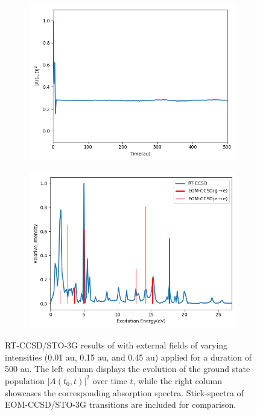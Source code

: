 \begin{figure}
\begin{subfigure}{0.47\textwidth}
         \includegraphics[width=\textwidth]{ch4/Figs/12-5.png}
     \end{subfigure}
     \hfill
     \begin{subfigure}{0.47\textwidth}
         \centering
         \includegraphics[width=\textwidth]{ch4/Figs/12-6.png}
     \end{subfigure}
     \caption{RT-CCSD/STO-3G results of  with external fields of varying intensities (0.01 au, 0.15 au, and 0.45 au) applied for a duration of 500 au. The left column displays the evolution of the ground state population $|A(t_{0}, t)|^{2}$ over time $t$, while the right column showcases the corresponding absorption spectra. Stick-spectra of EOM-CCSD/STO-3G transitions are included for comparison.}
     \label{fig:lih-ge}
\end{figure}